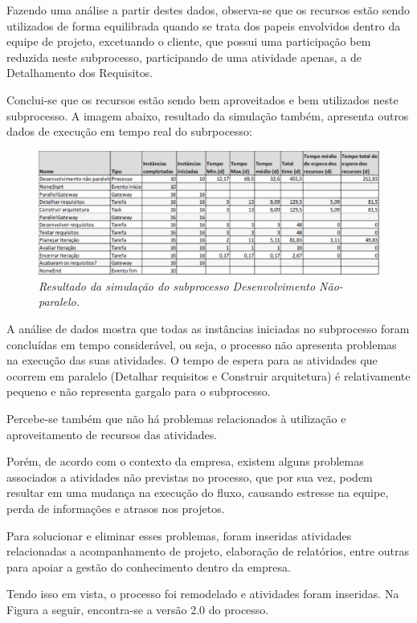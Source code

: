 Fazendo uma análise a partir destes dados, observa-se que os recursos estão sendo  utilizados de forma equilibrada quando se trata dos papeis envolvidos dentro da equipe de projeto, excetuando o cliente, que possui uma participação bem reduzida neste subprocesso, participando de uma atividade apenas, a de Detalhamento dos Requisitos. 

Conclui-se que os recursos estão sendo bem aproveitados e bem utilizados neste subprocesso. A imagem abaixo, resultado da simulação também, apresenta outros dados de execução em tempo real do subrpocesso:

\begin{figure}[H]
\centering\includegraphics[scale=0.4]{figuras/resultadoSimulacao.png}
\caption{\textit{Resultado da simulação do subprocesso Desenvolvimento Não-paralelo.}}
\end{figure}

A análise de dados mostra que todas as instâncias iniciadas no subprocesso foram concluídas em tempo considerável, ou seja, o processo não apresenta problemas na execução das suas atividades. O tempo de espera para as atividades que ocorrem em paralelo (Detalhar requisitos e Construir arquitetura) é relativamente pequeno e não representa gargalo para o subprocesso. 

Percebe-se também que não há problemas relacionados à utilização e aproveitamento de recursos das atividades. 

Porém, de acordo com o contexto da empresa, existem alguns problemas associados a atividades não previstas no processo, que por sua vez, podem resultar em uma mudança na execução do fluxo, causando estresse na equipe, perda de informações e atrasos nos projetos.

Para solucionar e eliminar esses problemas, foram inseridas atividades relacionadas a acompanhamento de projeto, elaboração de relatórios, entre outras para apoiar a gestão do conhecimento dentro da empresa.

Tendo isso em vista, o processo foi remodelado e atividades foram inseridas. Na Figura a seguir, encontra-se a versão 2.0 do processo. 

